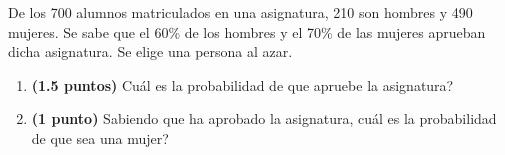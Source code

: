 
De los 700 alumnos matriculados en una asignatura, 210 son hombres y 490 mujeres. Se sabe que el 60\% de los hombres y el 70\% de las mujeres aprueban dicha asignatura. Se elige una persona al azar.
\begin{enumerate}[label=\alph*)]
\item \textbf{(1.5 puntos)} \textquestiondown{}Cuál es la probabilidad de que apruebe la asignatura?
\item \textbf{(1 punto)} Sabiendo que ha aprobado la asignatura, \textquestiondown{}cuál es la probabilidad de que sea una mujer?
\end{enumerate}
